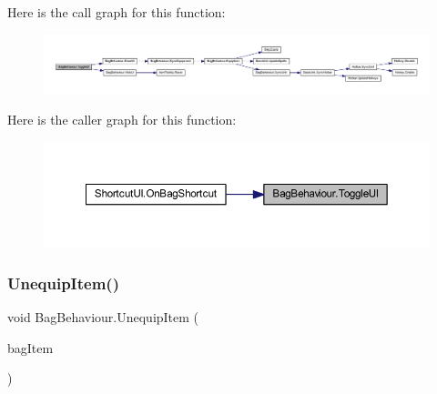 Here is the call graph for this function\+:
\nopagebreak
\begin{figure}[H]
\begin{center}
\leavevmode
\includegraphics[width=350pt]{class_bag_behaviour_a830725c05ecdc1a1a637d26cf5cff0dc_cgraph}
\end{center}
\end{figure}
Here is the caller graph for this function\+:
\nopagebreak
\begin{figure}[H]
\begin{center}
\leavevmode
\includegraphics[width=350pt]{class_bag_behaviour_a830725c05ecdc1a1a637d26cf5cff0dc_icgraph}
\end{center}
\end{figure}
\mbox{\label{class_bag_behaviour_a61062b91187139c43e2681c220111433}} 
\subsubsection{\texorpdfstring{UnequipItem()}{UnequipItem()}}
{\footnotesize\ttfamily void Bag\+Behaviour.\+Unequip\+Item (\begin{DoxyParamCaption}\item[{\mbox{\hyperlink{class_bag_item_behaviour}{Bag\+Item\+Behaviour}}}]{bag\+Item }\end{DoxyParamCaption})}

